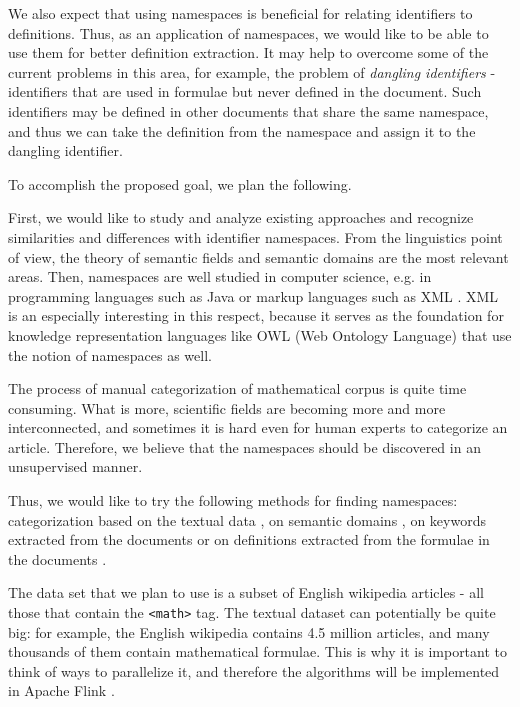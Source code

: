 We also expect that using namespaces is beneficial for relating identifiers to definitions. Thus, as an application of namespaces, we would like to be able to use them for better definition extraction. It may help to overcome some of the current problems in this area, for example, the problem of \emph{dangling identifiers} \cite{pagael2014mlp} - identifiers that are used in formulae but never defined in the document. Such identifiers may be defined in other documents that share the same namespace, and thus we can take the definition from the namespace and assign it to the dangling identifier.


To accomplish the proposed goal, we plan the following.

First, we would like to study and analyze existing approaches and recognize similarities and differences with identifier namespaces. From the linguistics point of view, the theory of semantic fields \cite{vassilyev1974theory} and semantic domains \cite{gliozzo2009semantic} are the most relevant areas. Then, namespaces are well studied in computer science, e.g. in programming languages such as Java \cite{gosling2014java} or markup languages such as XML \cite{xmlnamespaces}. XML is an especially interesting in this respect, because it serves as the foundation for knowledge representation languages like OWL (Web Ontology Language) \cite{mcguinness2004owl} that use the notion of namespaces as well.

The process of manual categorization of mathematical corpus is quite time consuming. What is more, scientific fields are becoming more and more interconnected, and sometimes it is hard even for human experts to categorize an article. Therefore, we believe that the namespaces should be discovered in an unsupervised manner.

Thus, we would like to try the following methods for finding namespaces: categorization based on the textual data \cite{sebastiani2002machine}, on semantic domains \cite{gliozzo2009semantic}, on keywords extracted from the documents \cite{schoneberg2014pos} or on definitions extracted from the formulae in the documents \cite{pagael2014mlp}.

The data set that we plan to use is a subset of English wikipedia articles - all those that contain the \texttt{<math>} tag. The textual dataset can potentially be quite big: for example, the English wikipedia contains 4.5 million articles, and many thousands of them contain mathematical formulae. This is why it is important to think of ways to parallelize it, and therefore the algorithms will be implemented in Apache Flink \cite{source:flink}.

